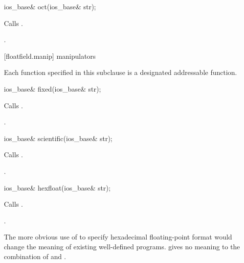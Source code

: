 %
\begin{itemdecl}
ios_base& oct(ios_base& str);
\end{itemdecl}

\begin{itemdescr}
\pnum
\effects
Calls
.

\pnum
\returns
{}.
\end{itemdescr}

[floatfield.manip]{ manipulators}

\pnum
Each function specified in this subclause
is a designated addressable function.

%
\begin{itemdecl}
ios_base& fixed(ios_base& str);
\end{itemdecl}

\begin{itemdescr}
\pnum
\effects
Calls
.

\pnum
\returns
{}.
\end{itemdescr}

%
\begin{itemdecl}
ios_base& scientific(ios_base& str);
\end{itemdecl}

\begin{itemdescr}
\pnum
\effects
Calls
.

\pnum
\returns
{}.
\end{itemdescr}

%
\begin{itemdecl}
ios_base& hexfloat(ios_base& str);
\end{itemdecl}

\begin{itemdescr}
\pnum
\effects
Calls .

\pnum
\returns
{}.
\end{itemdescr}

\pnum
\begin{note}
The more obvious use of
 to specify hexadecimal floating-point format would
change the meaning of existing well-defined programs. \CppIII{}
gives no meaning to the combination of  and
.
\end{note}

